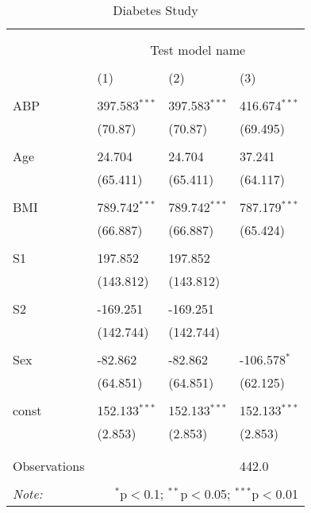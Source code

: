 \begin{table}[!htbp] \centering
  \caption{Diabetes Study}
  \label{}
\begin{tabularx}{\textwidth}{lXXX}
\\[-1.8ex]\hline
\hline \\[-1.8ex]
& \multicolumn{3}{c}{\textit{}} \
\cr \cline{3-4}
\\[-1.8ex] & \multicolumn{3}{c}{Test model name} \\\\[-1.8ex] & (1) & (2) & (3) \\
\hline \\[-1.8ex]
 ABP & 397.583$^{***}$ & 397.583$^{***}$ & 416.674$^{***}$ \\
  & (70.87) & (70.87) & (69.495) \\
  & & & \\
 Age & 24.704$^{}$ & 24.704$^{}$ & 37.241$^{}$ \\
  & (65.411) & (65.411) & (64.117) \\
  & & & \\
 BMI & 789.742$^{***}$ & 789.742$^{***}$ & 787.179$^{***}$ \\
  & (66.887) & (66.887) & (65.424) \\
  & & & \\
 S1 & 197.852$^{}$ & 197.852$^{}$ & \\
  & (143.812) & (143.812) & \\
  & & & \\
 S2 & -169.251$^{}$ & -169.251$^{}$ & \\
  & (142.744) & (142.744) & \\
  & & & \\
 Sex & -82.862$^{}$ & -82.862$^{}$ & -106.578$^{*}$ \\
  & (64.851) & (64.851) & (62.125) \\
  & & & \\
 const & 152.133$^{***}$ & 152.133$^{***}$ & 152.133$^{***}$ \\
  & (2.853) & (2.853) & (2.853) \\
  & & & \\
\hline \\[-1.8ex]
 Observations &   &   & 442.0 \\
\hline
\hline \\[-1.8ex]
\textit{Note:} & \multicolumn{3}{r}{$^{*}$p$<$0.1; $^{**}$p$<$0.05; $^{***}$p$<$0.01} \\
\end{tabularx}
\end{table}
